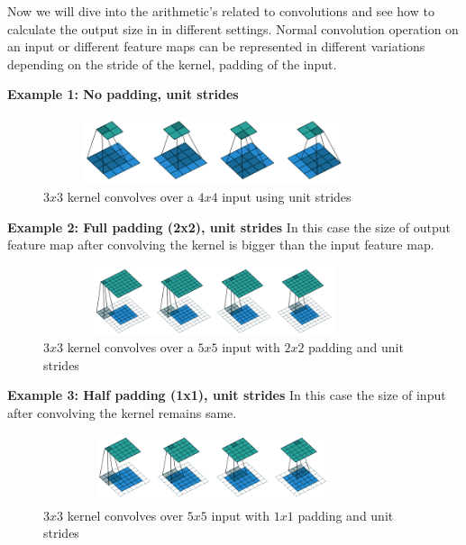     Now we will dive into the arithmetic's related to convolutions and see how to calculate the output size in
    in different settings. Normal convolution operation on an input or different feature maps can be represented in different variations depending on the stride of the kernel, padding of the input. 
    
    \textbf{Example 1: No padding, unit strides}   
    
      \begin{figure}[h]
    \centering
    \includegraphics[width=10cm, height =2cm]{images/cnn_case1.png}
    \caption{$3x3$ kernel convolves over a $4x4$ input using unit strides \cite{https://doi.org/10.48550/arxiv.1603.07285}}
    \end{figure}
    
    \textbf{Example 2: Full padding (2x2), unit strides} 
    In this case the size of output feature map after convolving the kernel is bigger than the input feature map.
      \begin{figure}[h]
    \centering
    \includegraphics[width=10cm, height =2cm]{images/cnn_case4.png}
    \caption{$3x3$ kernel convolves over a $5x5$ input with $2x2$ padding and unit strides \cite{https://doi.org/10.48550/arxiv.1603.07285}}
    \end{figure}
    
    \textbf{Example 3: Half padding (1x1), unit strides}
    In this case the size of input after convolving the kernel remains same. 
      \begin{figure}[h]
    \centering
    \includegraphics[width=10cm, height =2cm]{images/cnn_case3.png}
    \caption{$3x3$ kernel convolves over $5x5$ input with $1x1$ padding and unit strides \cite{https://doi.org/10.48550/arxiv.1603.07285}}
    \end{figure}
    
